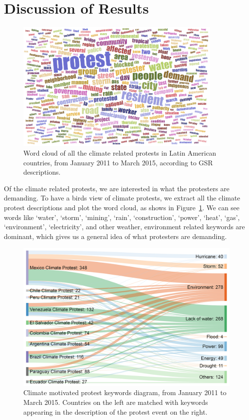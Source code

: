 \section{Discussion of Results}

\begin{figure}[ht]
\centerline
{\includegraphics[width=4in]{figures/Climate_word_cloud.png}}
\caption{Word cloud of all the climate related protests in Latin American countries, from January 2011 to March 2015, according to GSR descriptions.}
\label{wordcloud}
\end{figure}

Of the climate related protests, we are interested in what the protesters are
demanding. To have a birds view of climate protests, we extract all the climate protest descriptions and plot the word cloud, as shows in Figure~\ref{wordcloud}. We can see words like `water', `storm', `mining', `rain', `construction', `power', `heat', `gas', `environment', `electricity', and other weather, environment related keywords are dominant, which gives us a general idea of what protesters are demanding.

\begin{figure}[t]
\centerline
{\includegraphics[width=4.5in]{figures/causality1.png}}
\caption{Climate motivated protest keywords diagram, from January 2011 to March 2015. Countries on the left are matched with keywords appearing in the description of the protest event on the right.}
\label{causality}
\end{figure}


